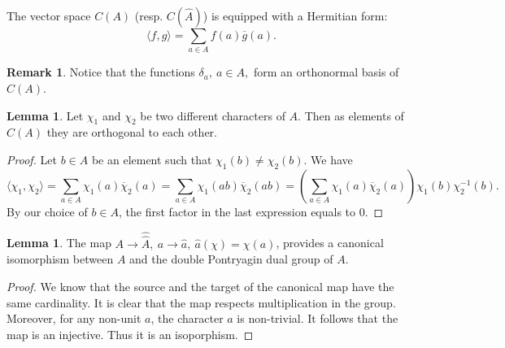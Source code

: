 \documentclass[11pt]{amsart}
\theoremstyle{definition}
\newtheorem{rem}[defi]{Remark}
\newtheorem{lem}[defi]{Lemma}
\begin{document}
The vector space $C(A)$ (resp. $C(\hat{A})$) is equipped with a Hermitian form: 
$$
\langle f,g\rangle=\sum_{a\in A}f(a)\overline g(a).$$
\begin{rem}
    Notice that the functions $\delta_a, \ a\in A,$ form an orthonormal basis of $C(A)$.
\end{rem}
\begin{lem} Let $\chi_1$ and $\chi_2$ be two different characters of $A$. Then as elements of $C(A)$ they are orthogonal to each other. 
\end{lem}
\begin{proof}
    Let $b\in A$ be an element such that $\chi_1(b)\ne\chi_2(b)$. We have
    $$\langle \chi_1,\chi_2\rangle=\sum_{a\in A}\chi_1(a)\overline \chi_2(a)=
    \sum_{a\in A}\chi_1(ab)\overline \chi_2(ab)=(\sum_{a\in A}\chi_1(a)\overline \chi_2(a))\chi_1(b)\chi_2^{-1}(b). 
    $$
    By our choice of $b\in A$, the first factor in the last expression equals to $0$.
\end{proof}
\begin{lem}
The map $A\to \hat{\hat{A}},\ a\to \hat{a},\ \hat{a}(\chi)=\chi(a)$, provides a canonical isomorphism between $A$ and the double Pontryagin dual group of $A$.
\end{lem}
\begin{proof}
    We know that the source and the target of the canonical map have the same cardinality. It is clear that the map respects multiplication in the group. Moreover, for any non-unit $a$, the character $\hat{a}$ is non-trivial. It follows that the map is an injective. Thus it is an isoporphism.
\end{proof}
\end{document}

